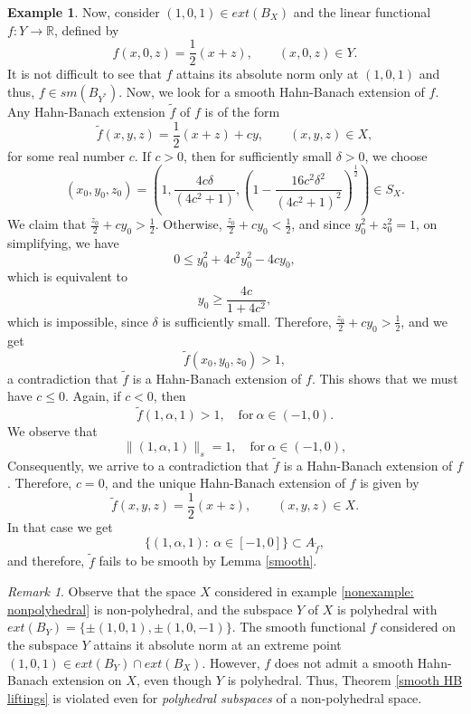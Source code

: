 \documentclass{amsart}
\theoremstyle{definition}
\newtheorem{example}[theorem]{Example}
\theoremstyle{remark}
\newtheorem{remark}[theorem]{Remark}
\numberwithin{equation}{section}
\begin{document}
\begin{example}
\noindent Now, consider $(1,0,1)\in ext(B_X)$ and the linear functional $f:Y\to \mathbb{R}$, defined by 
\[
f(x,0,z)=\frac{1}{2}(x+z), \qquad (x,0,z)\in Y. 
\]
It is not difficult to see that $f$ attains its absolute norm only at $(1,0,1)$ and thus, $f\in sm(B_{Y^*})$. Now, we look for a smooth Hahn-Banach extension of $f$. Any Hahn-Banach extension $\widetilde{f}$ of $f$ is of the form
\[
\widetilde{f}(x,y,z)=\frac{1}{2}(x+z)+cy, \qquad (x,y,z)\in X,
\]
for some real number $c$. If $c > 0$, then for sufficiently small $\delta>0$, we choose
\[
(x_0,y_0,z_0)=(1,\frac{4c\delta}{(4c^2+1)}, (1-\frac{16c^2\delta^2}{(4c^2+1)^2})^\frac{1}{2})\in S_X.
\]
We claim that $\frac{z_0}{2}+cy_0>\frac{1}{2}$. Otherwise, $\frac{z_0}{2}+cy_0<\frac{1}{2}$, and since $y_0^2+z_0^2=1$, on simplifying, we have
\[
0 \leq y_0^2+4c^2y_0^2-4cy_0,
\]
which is equivalent to
\[
y_0\geq \frac{4c}{1+4c^2},
\]
which is impossible, since $\delta$ is sufficiently small. Therefore,  $\frac{z_0}{2}+cy_0>\frac{1}{2}$, and we get
\[
\widetilde{f}(x_0,y_0,z_0)>1,
\]
a contradiction that $\widetilde{f}$ is a Hahn-Banach extension of $f$. This shows that we must have $c\leq 0$. Again, if $c<0$, then
\[
\widetilde{f}(1,\alpha,1)>1, \quad \text{for}~\alpha\in (-1,0). 
\]
We observe that
\[
\|(1,\alpha,1)\|_s=1, \quad \text{for}~\alpha\in (-1,0),
\]
Consequently, we arrive to a contradiction that $\widetilde{f}$ is a Hahn-Banach extension of $f$. Therefore, $c=0$, and the unique Hahn-Banach extension of $f$ is given by
\[
\widetilde{f}(x,y,z)=\frac{1}{2}(x+z), \qquad (x,y,z)\in X.
\]
In that case we get\[\{(1,\alpha,1):~\alpha\in [-1,0]\}\subset A_{\widetilde{f}},\]and therefore, $\widetilde{f}$ fails to be smooth by Lemma \ref{smooth}.
\end{example}

\begin{remark}
Observe that the space $X$ considered in example \ref{nonexample: nonpolyhedral} is non-polyhedral, and the subspace $Y$ of $X$ is polyhedral with $ext(B_Y)=\{\pm(1,0,1), \pm(1,0,-1)\}$. The smooth functional $f$ considered on the subspace $Y$ attains it absolute norm at an extreme point $(1,0,1)\in ext(B_Y)\cap ext(B_X)$. However, $f$ does not admit a smooth Hahn-Banach extension on $X$, even though $Y$ is polyhedral. Thus, Theorem \ref{smooth HB liftings} is violated even for \emph{polyhedral subspaces} of a non-polyhedral space.
\end{remark}
\end{document}
